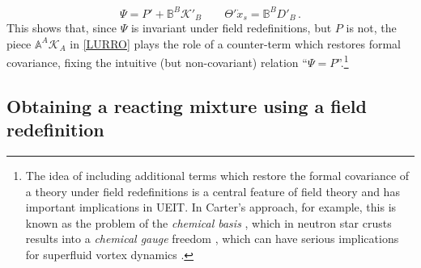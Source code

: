 \documentclass[a4paper, amsfonts, amssymb, amsmath, reprint, twocolumn, showkeys, nofootinbib]{revtex4-2}
\begin{document}
\begin{equation}
\Psi=P'+\mathbb{B}^B \mathcal{K}'_B  \quad \quad   \Theta' \dot{x}_s =  \mathbb{B}^B D'_B \, .
\end{equation}  
This shows that, since $\Psi$ is invariant under field redefinitions, but $P$ is not, the piece $\mathbb{A}^A \mathcal{K}_A$ in \eqref{LURRO} plays the role of a counter-term which restores formal covariance, fixing the intuitive (but non-covariant) relation ``$\Psi = P$''.\footnote{The idea of including additional terms which restore the formal covariance of a theory under field redefinitions is a central feature of field theory and has important implications in UEIT. In Carter's approach, for example, this is known as the problem of the \emph{chemical basis} \cite{Carter_starting_point,GavassinoRadiazione}, which in neutron star crusts results into a \emph{chemical gauge} freedom \cite{carter_macro_2006}, which can have serious implications for superfluid vortex dynamics \cite{GavassinoIordanskii2021}.}


\subsection{Obtaining a reacting mixture using a field redefinition}\label{chemistriuz}
\end{document}
